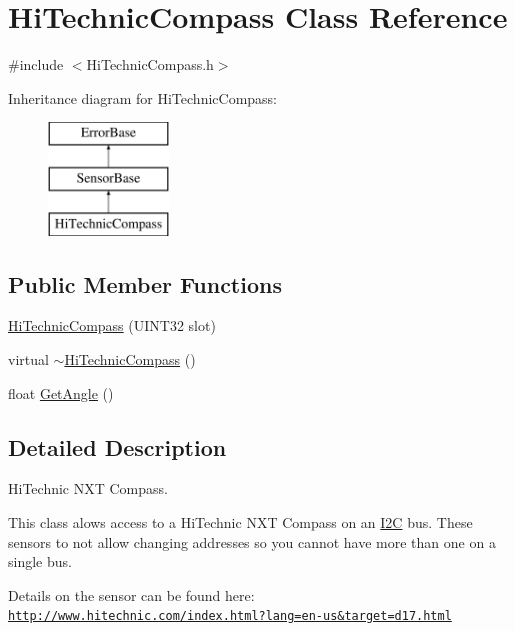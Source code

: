 \hypertarget{classHiTechnicCompass}{\section{\-Hi\-Technic\-Compass \-Class \-Reference}
\label{classHiTechnicCompass}
}


{\ttfamily \#include $<$\-Hi\-Technic\-Compass.\-h$>$}

\-Inheritance diagram for \-Hi\-Technic\-Compass\-:\begin{figure}[H]
\begin{center}
\leavevmode
\includegraphics[height=3.000000cm]{classHiTechnicCompass}
\end{center}
\end{figure}
\subsection*{\-Public \-Member \-Functions}
\begin{DoxyCompactItemize}
\item 
\hyperlink{classHiTechnicCompass_a6927401a1cdb1a5e32dbb226adfb3fd5}{\-Hi\-Technic\-Compass} (\-U\-I\-N\-T32 slot)
\item 
virtual \hyperlink{classHiTechnicCompass_a4492a67a04de360c3247f5ec648d4e97}{$\sim$\-Hi\-Technic\-Compass} ()
\item 
float \hyperlink{classHiTechnicCompass_af09859e82140181c2ae4cb2e62f8f991}{\-Get\-Angle} ()
\end{DoxyCompactItemize}


\subsection{\-Detailed \-Description}
\-Hi\-Technic \-N\-X\-T \-Compass.

\-This class alows access to a \-Hi\-Technic \-N\-X\-T \-Compass on an \hyperlink{classI2C}{\-I2\-C} bus. \-These sensors to not allow changing addresses so you cannot have more than one on a single bus.

\-Details on the sensor can be found here\-: \href{http://www.hitechnic.com/index.html?lang=en-us&target=d17.html}{\tt http\-://www.\-hitechnic.\-com/index.\-html?lang=en-\/us\&target=d17.\-html}

